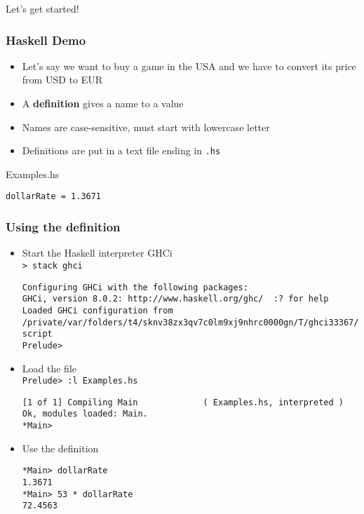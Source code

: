 \documentclass{beamer}
\subtitle{Starting Haskell}
\begin{document}
\begin{frame}
  \titlepage
\end{frame}

\begin{frame}
  \begin{Huge}
    \begin{center}
      Let's get started!
    \end{center}
  \end{Huge}
\end{frame}


\begin{frame}[fragile]
  \frametitle{Haskell Demo}
  \begin{itemize}
  \item  Let's say we want to buy a game in the USA and we have to
    convert its price from USD to EUR
  \item  A \textbf{definition} gives a name to a value
  \item Names are  case-sensitive, must start with lowercase letter
  \item Definitions are  put in a text file ending in \texttt{.hs}
  \end{itemize}
  \begin{block}{Examples.hs}
\begin{verbatim}
dollarRate = 1.3671
\end{verbatim}
  \end{block}
\end{frame}
\begin{frame}[fragile]
  \frametitle{Using the definition}
  \begin{itemize}
  \item Start the Haskell interpreter  GHCi\\
    \texttt{> stack ghci}
\begin{verbatim}
Configuring GHCi with the following packages: 
GHCi, version 8.0.2: http://www.haskell.org/ghc/  :? for help
Loaded GHCi configuration from /private/var/folders/t4/sknv38zx3qv7c0lm9xj9nhrc0000gn/T/ghci33367/ghci-script
Prelude> 
\end{verbatim}
  \item Load the file\\
    \texttt{Prelude> :l Examples.hs}
\begin{verbatim}
[1 of 1] Compiling Main             ( Examples.hs, interpreted )
Ok, modules loaded: Main.
*Main> 
\end{verbatim}
  \item Use the definition
\begin{verbatim}
*Main> dollarRate
1.3671
*Main> 53 * dollarRate
72.4563
\end{verbatim}
  \end{itemize}
\end{frame}
\end{document}
